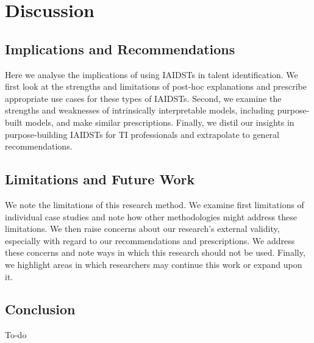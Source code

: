 

\chapter{\label{ch:discussion}Discussion}

\minitoc

\section{Implications and Recommendations}
Here we analyse the implications of using IAIDSTs in talent identification. We first look at the strengths and limitations of post-hoc explanations and prescribe appropriate use cases for these types of IAIDSTs. Second, we examine the strengths and weaknesses of intrinsically interpretable models, including purpose-built models, and make similar prescriptions. Finally, we distil our insights in purpose-building IAIDSTs for TI professionals and extrapolate to general recommendations.

\section{Limitations and Future Work}
We note the limitations of this research method. We examine first limitations of individual case studies and note how other methodologies might address these limitations. We then raise concerns about our research's external validity, especially with regard to our recommendations and prescriptions. We address these concerns and note ways in which this research should not be used. Finally, we highlight areas in which researchers may continue this work or expand upon it.

\section{Conclusion}
To-do